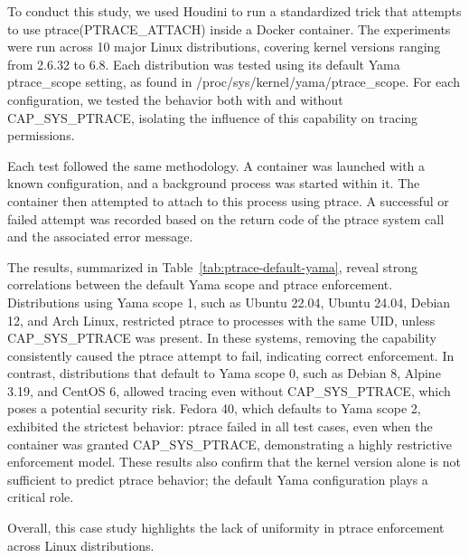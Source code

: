 \begin{doublespace}
To conduct this study, we used Houdini to run a standardized trick that attempts to use ptrace(PTRACE\_ATTACH) inside a Docker container. The experiments were run across 10 major Linux distributions, covering kernel versions ranging from 2.6.32 to 6.8. Each distribution was tested using its default Yama ptrace\_scope setting, as found in /proc/sys/kernel/yama/ptrace\_scope. For each configuration, we tested the behavior both with and without CAP\_SYS\_PTRACE, isolating the influence of this capability on tracing permissions.

Each test followed the same methodology. A container was launched with a known configuration, and a background process was started within it. The container then attempted to attach to this process using ptrace. A successful or failed attempt was recorded based on the return code of the ptrace system call and the associated error message.

The results, summarized in Table~\ref{tab:ptrace-default-yama}, reveal strong correlations between the default Yama scope and ptrace enforcement. Distributions using Yama scope 1, such as Ubuntu 22.04, Ubuntu 24.04, Debian 12, and Arch Linux, restricted ptrace to processes with the same UID, unless CAP\_SYS\_PTRACE was present. In these systems, removing the capability consistently caused the ptrace attempt to fail, indicating correct enforcement. In contrast, distributions that default to Yama scope 0, such as Debian 8, Alpine 3.19, and CentOS 6, allowed tracing even without CAP\_SYS\_PTRACE, which poses a potential security risk. Fedora 40, which defaults to Yama scope 2, exhibited the strictest behavior: ptrace failed in all test cases, even when the container was granted CAP\_SYS\_PTRACE, demonstrating a highly restrictive enforcement model. These results also confirm that the kernel version alone is not sufficient to predict ptrace behavior; the default Yama configuration plays a critical role.

Overall, this case study highlights the lack of uniformity in ptrace enforcement across Linux distributions.


\end{doublespace}
